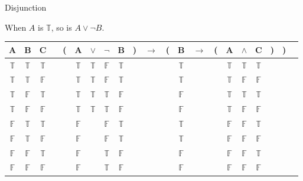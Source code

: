 \documentclass[
  ignorenonframetext,
]{beamer}
\renewcommand{\,}{\text{, }}
\def\True{\mathbb{T}}
\def\False{\mathbb{F}}
\begin{document}
\begin{frame}{Disjunction}
\protect\hypertarget{disjunction}{}

When \(A\) is \(\True\), so is \(A \vee \neg B\).

\begin{center}
\bigskip
\begin{tabular}{@{ }c@{ }@{ }c@{ }@{ }c | c@{ }@{}c@{}@{ }c@{ }@{ }c@{ }@{ }c@{ }@{ }c@{ }@{}c@{}@{ }c@{ }@{}c@{}@{ }c@{ }@{ }c@{ }@{}c@{}@{ }c@{ }@{ }c@{ }@{ }c@{ }@{}c@{}@{}c@{}@{ }c}
A & B & C &  & ( & A & $\vee$ & $\neg$ & B & ) & $\rightarrow$ & ( & B & $\rightarrow$ & ( & A & $\wedge$ & C & ) & ) & \\
\hline 
 $\True$ & $\True$ & $\True$ &  &  & $\True$ & $\True$ & $\False$ & $\True$ &  &&  & $\True$ &&  & $\True$ & $\True$ & $\True$ &  &  & \\
 $\True$ & $\True$ & $\False$ &  &  & $\True$ & $\True$ & $\False$ & $\True$ &  &&  & $\True$ &&  & $\True$ & $\False$ & $\False$ &  &  & \\
 $\True$ & $\False$ & $\True$ &  &  & $\True$ & $\True$ & $\True$ & $\False$ &  &&  & $\False$ &&  & $\True$ & $\True$ & $\True$ &  &  & \\
 $\True$ & $\False$ & $\False$ &  &  & $\True$ & $\True$ & $\True$ & $\False$ &  &&  & $\False$ &&  & $\True$ & $\False$ & $\False$ &  &  & \\
 $\False$ & $\True$ & $\True$ &  &  & $\False$ && $\False$ & $\True$ &  &&  & $\True$ &&  & $\False$ & $\False$ & $\True$ &  &  & \\
 $\False$ & $\True$ & $\False$ &  &  & $\False$ && $\False$ & $\True$ &  &&  & $\True$ &&  & $\False$ & $\False$ & $\False$ &  &  & \\
 $\False$ & $\False$ & $\True$ &  &  & $\False$ && $\True$ & $\False$ &  &&  & $\False$ &&  & $\False$ & $\False$ & $\True$ &  &  & \\
 $\False$ & $\False$ & $\False$ &  &  & $\False$ && $\True$ & $\False$ &  &&  & $\False$ &&  & $\False$ & $\False$ & $\False$ &  &  & \\
\end{tabular}
\bigskip
\end{center}

\end{frame}
\end{document}

